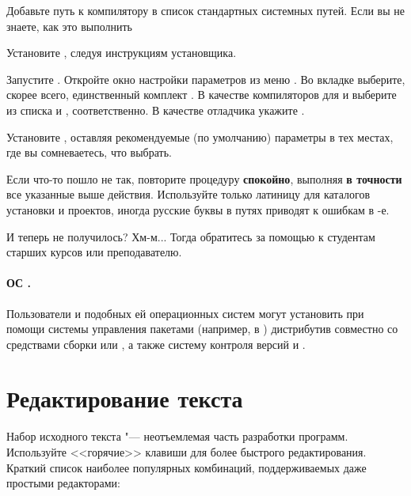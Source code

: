 {\begin{itemfeature}
\item Добавьте путь к компилятору в список стандартных системных путей. Если вы не знаете, как это выполнить

\item Установите , следуя инструкциям установщика.

\item Запустите . Откройте окно настройки параметров из меню  \code{->} . Во вкладке  выберите, скорее всего, единственный комплект . В качестве компиляторов для  и  выберите из списка  \GCC{}  и , соответственно. В качестве отладчика укажите \GDB.

\item Установите , оставляя рекомендуемые (по умолчанию) параметры в тех местах, где вы сомневаетесь, что выбрать.
\end{itemfeature}

Если что-то пошло не так, повторите процедуру \textbf{спокойно}, выполняя \textbf{в точности} все указанные выше действия. Используйте только латиницу для каталогов установки и проектов, иногда русские буквы в путях приводят к ошибкам в -е.

И теперь не получилось? Хм-м... Тогда обратитесь за помощью к студентам старших курсов или преподавателю.



\paragraph{ОС .}
Пользователи  и подобных ей операционных систем могут установить при помощи системы управления пакетами (например,  в ) дистрибутив  совместно со средствами сборки  \GCC{} или , а также систему контроля версий \git{} и .



\section{Редактирование текста}\label{sect:typing}
Набор исходного текста "--- неотъемлемая часть разработки программ. Используйте <<горячие>> клавиши для более быстрого редактирования. Краткий список наиболее популярных комбинаций, поддерживаемых даже простыми редакторами:

}
